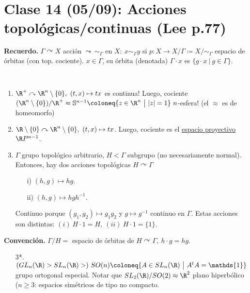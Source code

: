 \section{Clase 14 (05/09): Acciones topológicas/continuas (Lee p.77)}

\textbf{Recuerdo.} $\Gamma \curvearrowright X$ acción $\leadsto \ \sim_{\Gamma}$ en $X: \ x \sim_{\Gamma} y$ si $p: X \to X / \Gamma \coloneq X / \sim_{\Gamma}$ espacio de órbitas (con top. cociente). $x \in \Gamma $, su órbita (denotada) $\Gamma \cdot x$ es $\{g \cdot x \ \big| \ g \in \Gamma \}$. \newline

\begin{eg}~
	\begin{enumerate}
		\item $\R^+ \curvearrowright \R^n \setminus \{0\},\ (t,x) \mapsto tx$ es continua! Luego, cociente $(\R^n \setminus \{0\}) / \R^+ \approx \mathbb{S}^{n-1} \coloneq \{z \in \R^n \ \big| \ |z| = 1\}\ n$-esfera! (el $\approx$ es de homeomorfo)   

		\item $\R \setminus \{0\}  \curvearrowright \R^n \setminus \{0\},\ (t,x) \mapsto tx$. Luego, cociente es el \underline{espacio proyectivo}  $\R P^{n-1}$.

		\item $\Gamma$ grupo topológico arbitrario, $H < \Gamma $ subgrupo (no necesariamente normal). Entonces, hay dos acciones topológicas $H \curvearrowright \Gamma$
		\begin{enumerate}
			\item[i)] $(h,g) \mapsto hg$.

			\item[ii)] $(h,g) \mapsto hgh^{-1}$.
		\end{enumerate}
		 Continuo porque $(g_{1},g_{2}) \mapsto g_{1}g_{2}$ y $g \mapsto g^{-1}$ continuo en $\Gamma$. Estas acciones son distintas: $(i) \ H \cdot 1 = H,\ (ii) \ H \cdot 1 = \{1\}$.  
	\end{enumerate}
	\textbf{Convención.} $\Gamma / H =$ espacio de órbitas de $H \curvearrowright \Gamma ,\ h\cdot g = hg$.

	\begin{enumerate}
		\item[3*.] $(GL_n(\R)>SL_n(\R)>)\ SO(n) \coloneq \{ A \in SL_n(\R) \ \big| \ A^t A  = \mathds{1} \}$ grupo ortogonal especial. Notar que $SL_2(\R) / SO(2) \approx \R^2$ plano hiperbólico ($n\geq 3$: espacios simétricos de tipo no compacto.
	\end{enumerate}
\end{eg}

